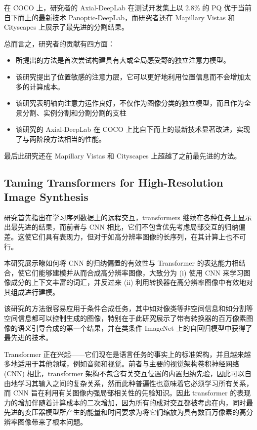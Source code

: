 在 COCO 上，研究者的 Axial-DeepLab 在测试开发集上以 2.8\% 的 PQ 优于当前自下而上的最新技术 Panoptic-DeepLab，而研究者还在 Mapillary Vistas 和 Cityscapes 上展示了最先进的分割结果。

总而言之，研究者的贡献有四方面：

\begin{itemize}
\item 所提出的方法是首次尝试构建具有大或全局感受野的独立注意力模型。
\item 该研究提出了位置敏感的注意力层，它可以更好地利用位置信息而不会增加太多的计算成本。
\item 该研究表明轴向注意力运作良好，不仅作为图像分类的独立模型，而且作为全景分割、实例分割和分割分割的支柱
\item 该研究的 Axial-DeepLab 在 COCO 上比自下而上的最新技术显著改进，实现了与两阶段方法相当的性能。
\end{itemize}

最后此研究还在 Mapillary Vistas 和 Cityscapes 上超越了之前最先进的方法。


\subsection{Taming Transformers for High-Resolution Image Synthesis}

研究首先指出在学习序列数据上的远程交互，transformers 继续在各种任务上显示出最先进的结果，而前者与 CNN 相比，它们不包含优先考虑局部交互的归纳偏差。这使它们具有表现力，但对于如高分辨率图像的长序列，在其计算上也不可行。

本研究展示瞭如何将 CNN 的归纳偏置的有效性与 Transformer 的表达能力相结合，使它们能够建模并从而合成高分辨率图像，大致分为 (i) 使用 CNN 来学习图像成分的上下文丰富的词汇，并反过来 (ii) 利用转换器在高分辨率图像中有效地对其组成进行建模。

该研究的方法很容易应用于条件合成任务，其中如对像类等非空间信息和如分割等空间信息都可以控制生成的图像，特别在于此研究展示了带有转换器的百万像素图像的语义引导合成的第一个结果，并在类条件 ImageNet 上的自回归模型中获得了最先进的技术。

Transformer 正在兴起——它们现在是语言任务的事实上的标准架构，并且越来越多地适用于其他领域，例如音频和视觉。前者与主要的视觉架构卷积神经网络 (CNN) 相比，transformer 架构不包含有关交互位置的内置归纳先验，因此可以自由地学习其输入之间的复杂关系，然而此种普遍性也意味着它必须学习所有关系，而 CNN 旨在利用有关图像内强局部相关性的先验知识。因此 transformer 的表现力的增加伴随着计算成本的二次增加，因为所有的成对交互都被考虑在内，同时最先进的变压器模型所产生的能量和时间要求为将它们缩放为具有数百万像素的高分辨率图像带来了根本问题。

